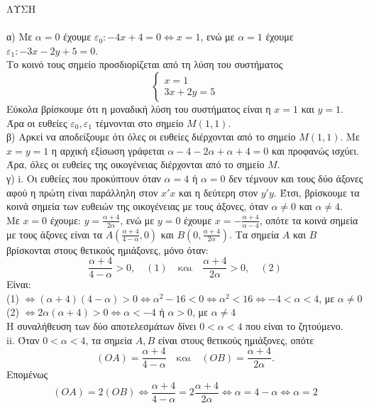ΛΥΣΗ
\\
\\
α) Με $\alpha=0$ έχουμε $\varepsilon_0: -4x + 4 = 0 \Leftrightarrow x = 1$, ενώ με $\alpha=1$ έχουμε $\varepsilon_1: -3x - 2y + 5 = 0$.
\\
Το κοινό τους σημείο προσδιορίζεται από τη λύση του συστήματος
\[ \begin{cases} x=1 \\ 3x+2y=5 \end{cases} \]
Εύκολα βρίσκουμε ότι η μοναδική λύση του συστήματος είναι η $x=1$ και $y=1$. Άρα οι ευθείες $\varepsilon_0, \varepsilon_1$ τέμνονται στο σημείο $M(1, 1)$.
\\
β) Αρκεί να αποδείξουμε ότι όλες οι ευθείες διέρχονται από το σημείο $M(1, 1)$. Με $x=y=1$ η αρχική εξίσωση γράφεται $\alpha-4-2\alpha+\alpha+4=0$ και προφανώς ισχύει. Άρα, όλες οι ευθείες της οικογένειας διέρχονται από το σημείο $M$.
\\
γ) i. Οι ευθείες που προκύπτουν όταν $\alpha=4$ ή $\alpha=0$ δεν τέμνουν και τους δύο άξονες αφού η πρώτη είναι παράλληλη στον $x'x$ και η δεύτερη στον $y'y$. Έτσι, βρίσκουμε τα κοινά σημεία των ευθειών της οικογένειας με τους άξονες, όταν $\alpha \neq 0$ και $\alpha \neq 4$.
\\
Με $x=0$ έχουμε: $y = \frac{\alpha+4}{2\alpha}$, ενώ με $y=0$ έχουμε $x = -\frac{\alpha+4}{\alpha-4}$, οπότε τα κοινά σημεία με τους άξονες είναι τα $A\left(\frac{\alpha+4}{4-\alpha}, 0\right)$ και $B\left(0, \frac{\alpha+4}{2\alpha}\right)$. Τα σημεία $A$ και $B$ βρίσκονται στους θετικούς ημιάξονες, μόνο όταν:
\[ \frac{\alpha+4}{4-\alpha} > 0, \quad (1) \quad \text{και} \quad \frac{\alpha+4}{2\alpha} > 0, \quad (2) \]
Είναι:
\\
(1) $\Leftrightarrow (\alpha+4)(4-\alpha) > 0 \Leftrightarrow \alpha^2 - 16 < 0 \Leftrightarrow \alpha^2 < 16 \Leftrightarrow -4 < \alpha < 4$, με $\alpha \neq 0$
\\
(2) $\Leftrightarrow 2\alpha(\alpha+4) > 0 \Leftrightarrow \alpha < -4$ ή $\alpha > 0$, με $\alpha \neq 4$
\\
Η συναλήθευση των δύο αποτελεσμάτων δίνει $0 < \alpha < 4$ που είναι το ζητούμενο.
\\
ii. Όταν $0 < \alpha < 4$, τα σημεία $A, B$ είναι στους θετικούς ημιάξονες, οπότε
\[ (OA) = \frac{\alpha+4}{4-\alpha} \quad \text{και} \quad (OB) = \frac{\alpha+4}{2\alpha}. \]
Επομένως
\[ (OA) = 2(OB) \Leftrightarrow \frac{\alpha+4}{4-\alpha} = 2 \frac{\alpha+4}{2\alpha} \Leftrightarrow \alpha = 4-\alpha \Leftrightarrow \alpha = 2 \]
\unskip